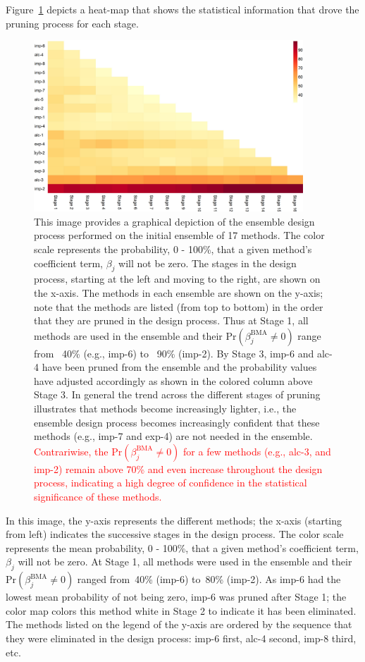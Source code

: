 \documentclass[journal=jpcbfk, manuscript=article]{achemso}
\newcommand{\+}[1]{\ensuremath{\mathbf{#1}}}
\newcommand{\rev}[1]{\textsf{\textcolor{red}{#1}}}
\begin{document}
Figure~\ref{Analysis:Figure3:P-not} depicts a heat-map that shows the statistical information that drove the pruning process for each stage.
\begin{figure}[h!]
	\centering
	\includegraphics[keepaspectratio,width=0.9\textwidth]{Figures/Rev2/P_Not_Zero_Per_Stage2}
	\caption{This image provides a graphical depiction of the ensemble design process performed on the initial ensemble of 17 methods.
	The color scale represents the probability, 0 - 100\%, that a given method's coefficient term, $\beta_j$ will not be zero.
	The stages in the design process, starting at the left and moving to the right, are shown on the x-axis.
	The methods in each ensemble are shown on the y-axis; note that the methods are listed (from top to bottom) in the order that they are pruned in the design process.
	Thus at Stage 1, all methods are used in the ensemble and their $\mathrm{Pr}(\beta_j^{\text{BMA}}\neq 0) $ range from ~40\% (e.g., imp-6) to ~90\% (imp-2).
	By Stage 3, imp-6 and alc-4 have been pruned from the ensemble and the probability values have adjusted accordingly as shown in the colored column above Stage 3.
	In general the trend across the different stages of pruning illustrates that methods become increasingly lighter, i.e., the ensemble design process becomes increasingly confident that these methods (e.g., imp-7 and exp-4) are not needed in the ensemble.
	\rev{Contrariwise, the $\mathrm{Pr}(\beta_j^{\text{BMA}}\neq 0) $ for a few methods (e.g., alc-3, and imp-2) remain above 70\% and even increase throughout the design process, indicating a high degree of confidence in the statistical significance of these methods.}}
	\label{Analysis:Figure3:P-not}
\end{figure}
In this image, the y-axis represents the different methods; the x-axis (starting from left) indicates the successive stages in the design process.
The color scale represents the mean probability, 0 - 100\%, that a given method's coefficient term, $\beta_j$ will not be zero.
At Stage 1, all methods were used in the ensemble and their $\mathrm{Pr}(\beta_j^{\text{BMA}}\neq 0)$ ranged from~40\% (imp-6) to~80\% (imp-2).
As imp-6 had the lowest mean probability of not being zero, imp-6 was pruned after Stage 1; the color map colors this method white in Stage 2 to indicate it has been eliminated.
The methods listed on the legend of the y-axis are  ordered by the sequence that they were eliminated in the design process: imp-6 first, alc-4 second, imp-8 third, etc.
\end{document}
